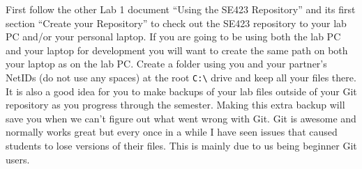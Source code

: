 \documentclass[11pt]{article}
\begin{document}
First follow the other Lab 1 document “Using the SE423 Repository” and its first section “Create your Repository” to check out the SE423 repository to your lab PC and/or your personal laptop. If you are going to be using both the lab PC and your laptop for development you will want to create the same path on both your laptop as on the lab PC. Create a folder using you and your partner’s NetIDs (do not use any spaces) at the root \lstinline|C:\| drive and keep all your files there. It is also a good idea for you to make backups of your lab files outside of your Git repository as you progress through the semester. Making this extra backup will save you when we can’t figure out what went wrong with Git. Git is awesome and normally works great but every once in a while I have seen issues that caused students to lose versions of their files. This is mainly due to us being beginner Git users.
\end{document}
